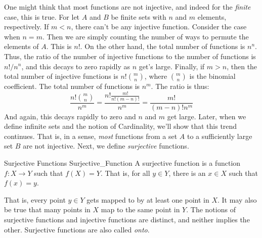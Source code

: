 \documentclass[crop=false,class=book,oneside]{standalone}
\begin{document}
                One might think that most functions are not injective,
                and indeed for the \textit{finite} case, this is true.
                For let $A$ and $B$ be finite sets with $n$ and $m$
                elements, respectively. If $m<n$, there can't be
                any injective function. Consider the case when $n=m$.
                Then we are simply counting the number of ways to
                permute the elements of $A$. This is $n!$. On the
                other hand, the total number of functions is
                $n^{n}$. Thus, the ratio of the number of injective
                functions to the number of functions is
                $n!/n^{n}$, and this decays to zero rapidly as
                $n$ get's large. Finally, if $m>n$, then the total
                number of injective functions is
                $n!\binom{m}{n}$, where $\binom{m}{n}$ is the
                binomial coefficient. The total number of functions
                is $n^{m}$. The ratio is thus:
                \begin{equation}
                    \frac{n!\binom{m}{n}}{n^{m}}=
                    \frac{n!\frac{m!}{n!(m-n)!}}{n^{m}}
                    =\frac{m!}{(m-n)!n^{m}}
                \end{equation}
                And again, this decays rapidly to zero and $n$ and $m$
                get large. Later, when we define infinite sets
                and the notion of Cardinality, we'll show that this
                trend continues. That is, in a sense, \textit{most}
                functions from a set $A$ to a sufficiently large set
                $B$ are not injective. Next, we define
                \textit{surjective} functions.
                \begin{ldefinition}{Surjective Functions}
                      {Surjective_Function}
                    A \gls{surjective function} is a function
                    $f:X\rightarrow{Y}$ such that $f(X)=Y$.
                    That is, for all $y\in{Y}$, there is an
                    $x\in{X}$ such that $f(x)=y$.
                \end{ldefinition}
                That is, every point $y\in{Y}$ gets mapped to by
                at least one point in $X$. It may also be true that
                many points in $X$ map to the same point in $Y$.
                The notions of surjective functions and injective
                functions are distinct, and neither implies the
                other. Surjective functions are also called
                \textit{onto}.
\end{document}
